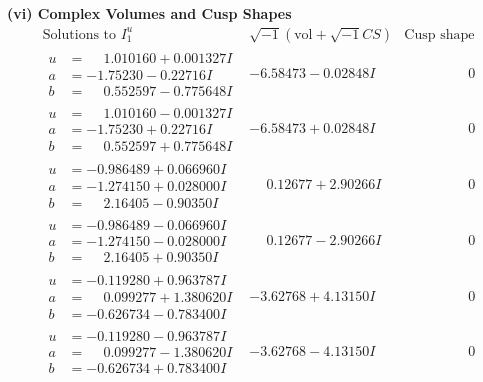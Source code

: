 \documentclass[1p]{elsarticle_modified}
\theoremstyle{definition}
\newcommand{\I}{\sqrt{-1}}
\begin{document}
\newpage\flushleft \textbf{(vi) Complex Volumes and Cusp Shapes}
$$\begin{array}{c|c|c}  
\text{Solutions to }I^u_{1}& \I (\text{vol} + \sqrt{-1}CS) & \text{Cusp shape}\\
 \hline 
\begin{aligned}
u &= \phantom{-}1.010160 + 0.001327 I \\
a &= -1.75230 - 0.22716 I \\
b &= \phantom{-}0.552597 - 0.775648 I\end{aligned}
 & -6.58473 - 0.02848 I & \phantom{-0.000000 } 0 \\ \hline\begin{aligned}
u &= \phantom{-}1.010160 - 0.001327 I \\
a &= -1.75230 + 0.22716 I \\
b &= \phantom{-}0.552597 + 0.775648 I\end{aligned}
 & -6.58473 + 0.02848 I & \phantom{-0.000000 } 0 \\ \hline\begin{aligned}
u &= -0.986489 + 0.066960 I \\
a &= -1.274150 + 0.028000 I \\
b &= \phantom{-}2.16405 - 0.90350 I\end{aligned}
 & \phantom{-}0.12677 + 2.90266 I & \phantom{-0.000000 } 0 \\ \hline\begin{aligned}
u &= -0.986489 - 0.066960 I \\
a &= -1.274150 - 0.028000 I \\
b &= \phantom{-}2.16405 + 0.90350 I\end{aligned}
 & \phantom{-}0.12677 - 2.90266 I & \phantom{-0.000000 } 0 \\ \hline\begin{aligned}
u &= -0.119280 + 0.963787 I \\
a &= \phantom{-}0.099277 + 1.380620 I \\
b &= -0.626734 - 0.783400 I\end{aligned}
 & -3.62768 + 4.13150 I & \phantom{-0.000000 } 0 \\ \hline\begin{aligned}
u &= -0.119280 - 0.963787 I \\
a &= \phantom{-}0.099277 - 1.380620 I \\
b &= -0.626734 + 0.783400 I\end{aligned}
 & -3.62768 - 4.13150 I & \phantom{-0.000000 } 0 \\ \hline\begin{aligned}

\end{aligned}
\end{array}$$
\end{document}
